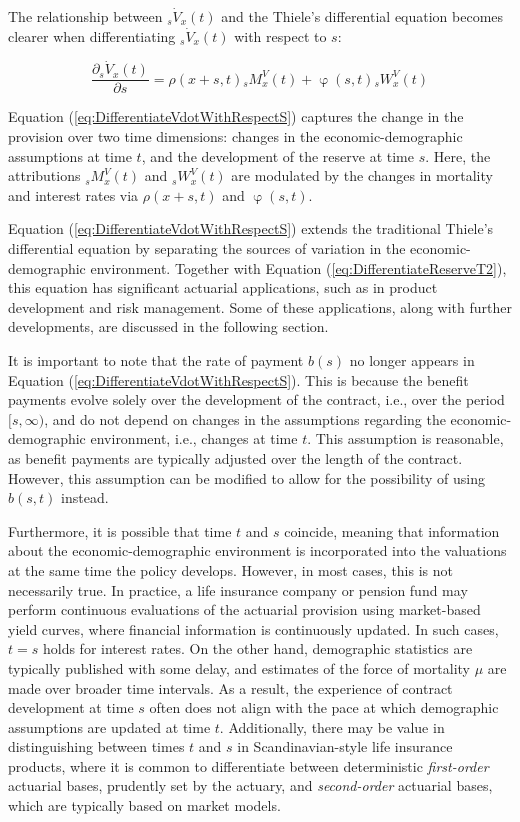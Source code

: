 \documentclass[12pt]{article}
\begin{document}
 
The relationship between ${}_s\dot{V}_x(t)$ and the Thiele's differential equation becomes clearer when differentiating ${}_s\dot{V}_x(t)$ with respect to $s$: 

\begin{equation}\label{eq:DifferentiateVdotWithRespectS}
\dfrac{\partial	{}_s\dot{V}_x(t)}{\partial s}= \rho(x+s,t) {}_sM^V_x(t)+ \upvarphi(s,t) {}_sW^V_x(t)
\end{equation}

Equation (\ref{eq:DifferentiateVdotWithRespectS}) captures the change in the provision over two time dimensions: changes in the economic-demographic assumptions at time \( t \), and the development of the reserve at time \( s \). Here, the attributions \( {}_sM^V_x(t) \) and \( {}_sW^V_x(t) \) are modulated by the changes in mortality and interest rates via \( \rho(x+s,t) \) and \( \upvarphi(s,t) \).

Equation (\ref{eq:DifferentiateVdotWithRespectS}) extends the traditional Thiele’s differential equation by separating the sources of variation in the economic-demographic environment. Together with Equation (\ref{eq:DifferentiateReserveT2}), this equation has significant actuarial applications, such as in product development and risk management. Some of these applications, along with further developments, are discussed in the following section.

It is important to note that the rate of payment \( b(s) \) no longer appears in Equation (\ref{eq:DifferentiateVdotWithRespectS}). This is because the benefit payments evolve solely over the development of the contract, i.e., over the period \( [s, \infty) \), and do not depend on changes in the assumptions regarding the economic-demographic environment, i.e., changes at time \( t \). This assumption is reasonable, as benefit payments are typically adjusted over the length of the contract. However, this assumption can be modified to allow for the possibility of using \( b(s,t) \) instead.

Furthermore, it is possible that time \( t \) and \( s \) coincide, meaning that information about the economic-demographic environment is incorporated into the valuations at the same time the policy develops. However, in most cases, this is not necessarily true. In practice, a life insurance company or pension fund may perform continuous evaluations of the actuarial provision using market-based yield curves, where financial information is continuously updated. In such cases, \( t = s \) holds for interest rates. On the other hand, demographic statistics are typically published with some delay, and estimates of the force of mortality \( \mu \) are made over broader time intervals. As a result, the experience of contract development at time \( s \) often does not align with the pace at which demographic assumptions are updated at time \( t \). Additionally, there may be value in distinguishing between times \( t \) and \( s \) in Scandinavian-style life insurance products, where it is common to differentiate between deterministic \textit{first-order} actuarial bases, prudently set by the actuary, and \textit{second-order} actuarial bases, which are typically based on market models.
\end{document}
